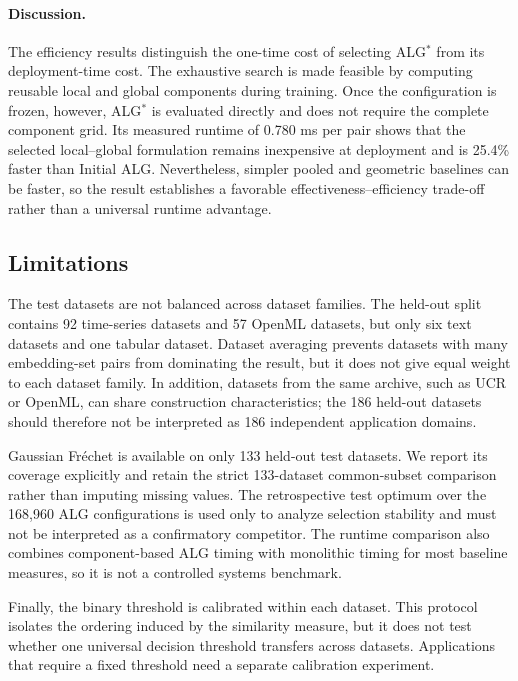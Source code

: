 \documentclass[preprint,12pt]{elsarticle}
\begin{document}
\paragraph{Discussion.}
The efficiency results distinguish the one-time cost of selecting ALG$^*$ from
its deployment-time cost. The exhaustive search is made feasible by computing
reusable local and global components during training. Once the configuration
is frozen, however, ALG$^*$ is evaluated directly and does not require the
complete component grid. Its measured runtime of 0.780 ms per pair shows that
the selected local--global formulation remains inexpensive at deployment and
is 25.4\% faster than Initial ALG. Nevertheless, simpler pooled and geometric
baselines can be faster, so the result establishes a favorable
effectiveness--efficiency trade-off rather than a universal runtime advantage.

\subsection{Limitations}

The test datasets are not balanced across dataset families. The held-out split
contains 92 time-series datasets and 57 OpenML datasets, but only six text
datasets and one tabular dataset. Dataset averaging prevents datasets with
many embedding-set pairs from dominating the result, but it does not give equal
weight to each dataset family. In addition, datasets from the same archive, such
as UCR or OpenML, can share construction characteristics; the 186 held-out
datasets should therefore not be interpreted as 186 independent application
domains.

Gaussian Fr\'echet is available on only 133 held-out test datasets. We report
its coverage explicitly and retain the strict 133-dataset common-subset comparison rather
than imputing missing values. The retrospective test optimum over the 168,960
ALG configurations is used only to analyze selection stability and must not be
interpreted as a confirmatory competitor. The runtime comparison also combines
component-based ALG timing with monolithic timing for most baseline measures,
so it is not a controlled systems benchmark.

Finally, the binary threshold is calibrated within each dataset. This protocol
isolates the ordering induced by the similarity measure, but it does not test
whether one universal decision threshold transfers across datasets. Applications
that require a fixed threshold need a separate calibration experiment. 
\end{document}

